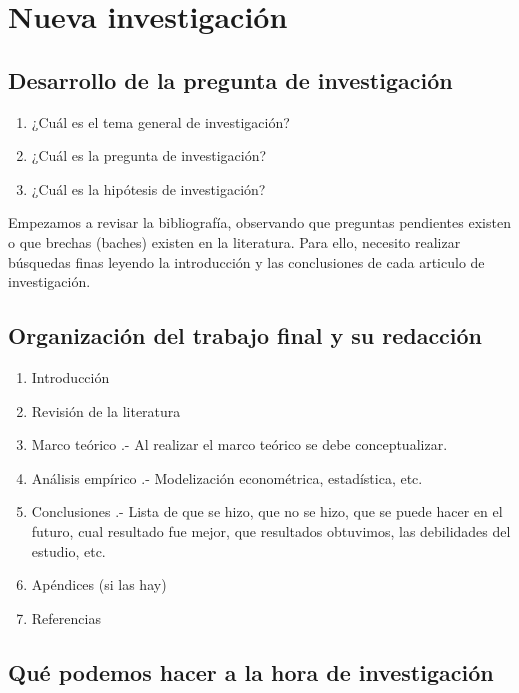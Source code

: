 \chapter{Nueva investigación}

\section{Desarrollo de la pregunta de investigación}

\begin{enumerate}[1.]
    \item ¿Cuál es el tema general de investigación?
    \item ¿Cuál es la pregunta de investigación?
    \item ¿Cuál es la hipótesis de investigación?
\end{enumerate}

Empezamos a revisar la bibliografía, observando que preguntas pendientes existen o que brechas (baches) existen en la literatura. Para ello, necesito realizar búsquedas finas leyendo la introducción y las conclusiones de cada articulo de investigación.\\


\section{Organización del trabajo final y su redacción}

\begin{enumerate}[1.]
    \item Introducción
    \item Revisión de la literatura
    \item Marco teórico .- Al realizar el marco teórico se debe conceptualizar.
    \item Análisis empírico .- Modelización econométrica, estadística, etc.
    \item Conclusiones .- Lista de que se hizo, que no se hizo, que se puede hacer en el futuro, cual resultado fue mejor, que resultados obtuvimos, las debilidades del estudio, etc.
    \item Apéndices (si las hay)
    \item Referencias
\end{enumerate}

\section{Qué podemos hacer a la hora de investigación}


